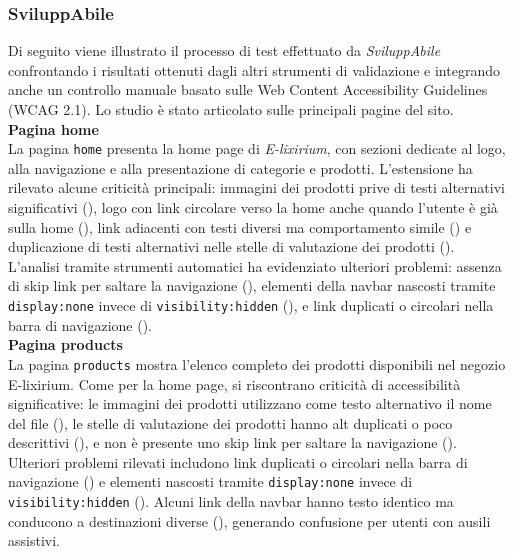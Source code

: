 \subsubsection{SviluppAbile}
\noindent Di seguito viene illustrato il processo di test effettuato da \textit{SviluppAbile} confrontando i risultati ottenuti dagli altri strumenti di validazione e integrando anche un controllo manuale basato sulle Web Content Accessibility Guidelines (WCAG 2.1). Lo studio è stato articolato sulle principali pagine del sito.\\

\noindent \textbf{Pagina home}\\
La pagina \texttt{home} presenta la home page di \textit{E-lixirium}, con sezioni dedicate al logo, alla navigazione e alla presentazione di categorie e prodotti. L’estensione ha rilevato alcune criticità principali: immagini dei prodotti prive di testi alternativi significativi ({}), logo con link circolare verso la home anche quando l’utente è già sulla home ({}), link adiacenti con testi diversi ma comportamento simile ({}) e duplicazione di testi alternativi nelle stelle di valutazione dei prodotti ({}).\\
L’analisi tramite strumenti automatici ha evidenziato ulteriori problemi: assenza di skip link per saltare la navigazione ({}), elementi della navbar nascosti tramite \texttt{display:none} invece di \texttt{visibility:hidden} ({}), e link duplicati o circolari nella barra di navigazione ({}).\\

\noindent \textbf{Pagina products}\\
La pagina \texttt{products} mostra l’elenco completo dei prodotti disponibili nel negozio E-lixirium. Come per la home page, si riscontrano criticità di accessibilità significative: le immagini dei prodotti utilizzano come testo alternativo il nome del file ({}), le stelle di valutazione dei prodotti hanno alt duplicati o poco descrittivi ({}), e non è presente uno skip link per saltare la navigazione ({}).\\
Ulteriori problemi rilevati includono link duplicati o circolari nella barra di navigazione ({}) e elementi nascosti tramite \texttt{display:none} invece di \texttt{visibility:hidden} ({}). Alcuni link della navbar hanno testo identico ma conducono a destinazioni diverse ({}), generando confusione per utenti con ausili assistivi.\\

